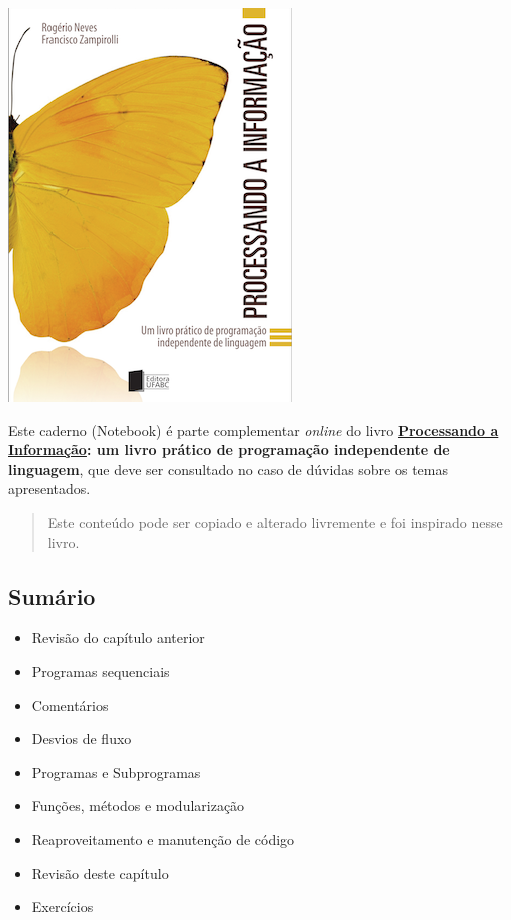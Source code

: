 \documentclass[12pt,a4paper]{article}
\providecommand{\tightlist}{%
      \setlength{\itemsep}{0pt}\setlength{\parskip}{0pt}}
\begin{document}
    \includegraphics{"figs/Capa_Processando_Informacao.jpg"}

Este caderno (Notebook) é parte complementar \emph{online} do livro
\textbf{\href{https://editora.ufabc.edu.br/matematica-e-ciencias-da-computacao/58-processando-a-informacao}{Processando
a Informação}: um livro prático de programação independente de
linguagem}, que deve ser consultado no caso de dúvidas sobre os temas
apresentados.

\begin{quote}
Este conteúdo pode ser copiado e alterado livremente e foi inspirado
nesse livro.
\end{quote}

    \hypertarget{sumuxe1rio}{%
\subsection{Sumário}\label{sumuxe1rio}}

\begin{itemize}
\tightlist
\item
  Revisão do capítulo anterior
\item
  Programas sequenciais
\item
  Comentários
\item
  Desvios de fluxo
\item
  Programas e Subprogramas
\item
  Funções, métodos e modularização
\item
  Reaproveitamento e manutenção de código
\item
  Revisão deste capítulo
\item
  Exercícios
\end{itemize}
\end{document}
